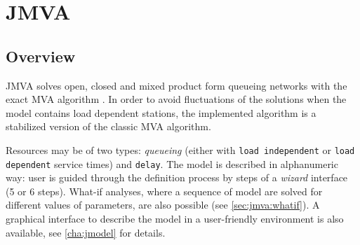 %
%
%
%
%
\chapter{JMVA}
\label{cha:jmva}
\section{Overview}
JMVA solves open, closed and mixed product form \cite{BCMP} queueing
networks with the exact MVA algorithm \cite{MVA}. In order to avoid
fluctuations of the solutions when the model contains load dependent
stations, the implemented algorithm is a stabilized version
\cite{AMVA} of the classic MVA algorithm.

Resources may be of two types: \emph{queueing} (either with
\texttt{load independent} or \texttt{load dependent} service times)
and \texttt{delay}. The model is described in alphanumeric way: user
is guided through the definition process by steps of a \emph{wizard}
interface (5 or 6 steps). What-if analyses, where a sequence of model are solved for different
values of parameters, are also possible (see \autoref{sec:jmva:whatif}). A graphical interface to describe the model in a user-friendly environment is also available, see \autoref{cha:jmodel} for details.

